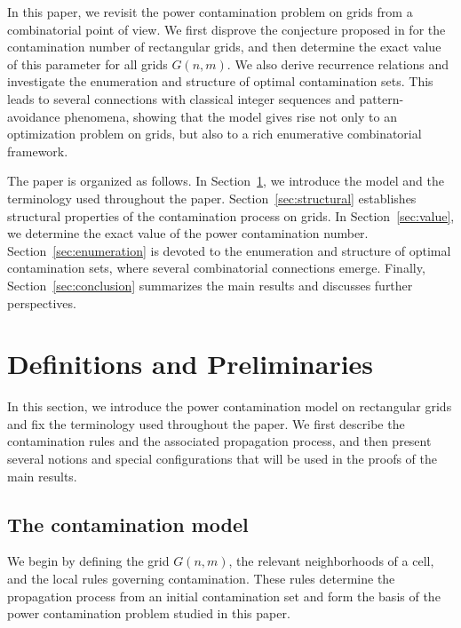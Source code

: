 \documentclass[letterpaper,12pt]{article}
\begin{document}
In this paper, we revisit the power contamination problem on grids from a combinatorial point of view. We first disprove the conjecture proposed in \cite{Ainouche2021} for the contamination number of rectangular grids, and then determine the exact value of this parameter for all grids \(G(n,m)\). We also derive recurrence relations and investigate the enumeration and structure of optimal contamination sets. This leads to several connections with classical integer sequences and pattern-avoidance phenomena, showing that the model gives rise not only to an optimization problem on grids, but also to a rich enumerative combinatorial framework.

The paper is organized as follows. In Section~\ref{sec:definitions}, we introduce the model and the terminology used throughout the paper. Section~\ref{sec:structural} establishes structural properties of the contamination process on grids. In Section~\ref{sec:value}, we determine the exact value of the power contamination number. Section~\ref{sec:enumeration} is devoted to the enumeration and structure of optimal contamination sets, where several combinatorial connections emerge. Finally, Section~\ref{sec:conclusion} summarizes the main results and discusses further perspectives. 




 






 




 



\section{Definitions and Preliminaries}
\label{sec:definitions}
In this section, we introduce the power contamination model on rectangular grids and fix the terminology used throughout the paper. We first describe the contamination rules and the associated propagation process, and then present several notions and special configurations that will be used in the proofs of the main results.

\subsection{The contamination model}
We begin by defining the grid \(G(n,m)\), the relevant neighborhoods of a cell, and the local rules governing contamination. These rules determine the propagation process from an initial contamination set and form the basis of the power contamination problem studied in this paper.
\end{document}
